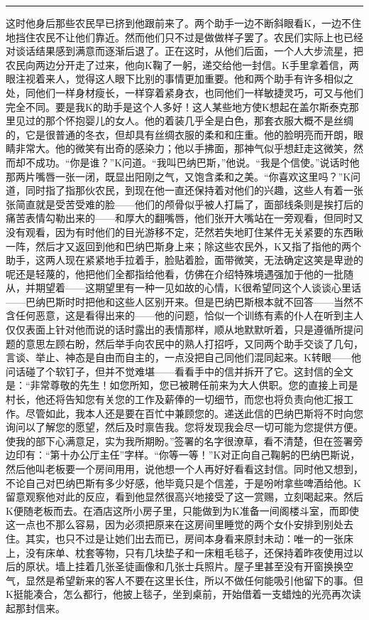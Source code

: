 \documentclass[12pt,a4paper]{article}
\begin{document}
\noindent\rule{\textwidth}{0.4pt}

\vspace{0.3em}



这时他身后那些农民早已挤到他跟前来了。两个助手一边不断斜眼看K，一边不住地挡住农民不让他们靠近。然而他们只不过是做做样子罢了。农民们实际上也已经对谈话结果感到满意而逐渐后退了。正在这时，从他们后面，一个人大步流星，把农民向两边分开走了过来，他向K鞠了一躬，递交给他一封信。K手里拿着信，两眼注视着来人，觉得这人眼下比别的事情更加重要。他和两个助手有许多相似之处，同他们一样身材瘦长，一样穿着紧身衣，也同他们一样敏捷灵巧，可又与他们完全不同。要是我K的助手是这个人多好！这人某些地方使K想起在盖尔斯泰克那里见过的那个怀抱婴儿的女人。他的着装几乎全是白色，那套衣服大概不是丝绸的，它是很普通的冬衣，但却具有丝绸衣服的柔和和庄重。他的脸明亮而开朗，眼睛非常大。他的微笑有出奇的感染力；他以手拂面，那神气似乎想赶走这微笑，然而却不成功。“你是谁？”K问道。“我叫巴纳巴斯，”他说。“我是个信使。”说话时他那两片嘴唇一张一闭，既显出阳刚之气，又饱含柔和之美。“你喜欢这里吗？”K问道，同时指了指那伙农民，到现在他一直还保持着对他们的兴趣，这些人有着一张张简直就是受苦受难的脸——他们的颅骨似乎被人打扁了，面部线条则是挨打后的痛苦表情勾勒出来的——和厚大的翻嘴唇，他们张开大嘴站在一旁观看，但同时又没有观看，因为有时他们的目光游移不定，茫然若失地盯住某件无关紧要的东西瞅一阵，然后才又返回到他和巴纳巴斯身上来；除这些农民外，K又指了指他的两个助手，这两人现在紧紧地手拉着手，脸贴着脸，面带微笑，无法确定这笑是卑逊的呢还是轻蔑的，他把他们全都指给他看，仿佛在介绍特殊境遇强加于他的一批随从，并期望着——这期望里有一种一见如故的心情，K很希望同这个人谈谈心里话——巴纳巴斯时时把他和这些人区别开来。但是巴纳巴斯根本就不回答——当然不含任何恶意，这是看得出来的——他的问题，恰似一个训练有素的仆人在听到主人仅仅表面上针对他而说的话时露出的表情那样，顺从地默默听着，只是遵循所提问题的意思左顾右盼，然后举手向农民中的熟人打招呼，又同两个助手交谈了几句，言谈、举止、神态是自由而自主的，一点没把自己同他们混同起来。K转眼——他问话碰了个软钉子，但并不觉难堪——看看手中的信并拆开了它。这封信的全文是：“非常尊敬的先生！如您所知，您已被聘任前来为大人供职。您的直接上司是村长，他还将告知您有关您的工作及薪俸的一切细节，而您也将负责向他汇报工作。尽管如此，我本人还是要在百忙中兼顾您的。递送此信的巴纳巴斯将不时向您询问以了解您的愿望，然后及时禀告我。您将发现我会尽一切可能为您提供方便。使我的部下心满意足，实为我所期盼。”签署的名字很潦草，看不清楚，但在签署旁边印有：“第十办公厅主任”字样。“你等一等！”K对正向自己鞠躬的巴纳巴斯说，然后他叫老板要一个房间用用，说他想一个人再好好看看这封信。同时他又想到，不论自己对巴纳巴斯有多少好感，他毕竟只是个信差，于是吩咐拿些啤酒给他。K留意观察他对此的反应，看到他显然很高兴地接受了这一赏赐，立刻喝起来。然后K便随老板而去。在酒店这所小房子里，只能做到为K准备一间阁楼斗室，而即使这一点也不那么容易，因为必须把原来在这房间里睡觉的两个女仆安排到别处去住。其实，也只不过是让她们出去而已，房间本身看来原封未动：唯一的一张床上，没有床单、枕套等物，只有几块垫子和一床粗毛毯子，还保持着昨夜使用过以后的原状。墙上挂着几张圣徒画像和几张士兵照片。屋子里甚至没有开窗换换空气，显然是希望新来的客人不要在这里长住，所以不做任何能吸引他留下的事。但K挺能凑合，怎么都行，他披上毯子，坐到桌前，开始借着一支蜡烛的光亮再次读起那封信来。
\end{document}
